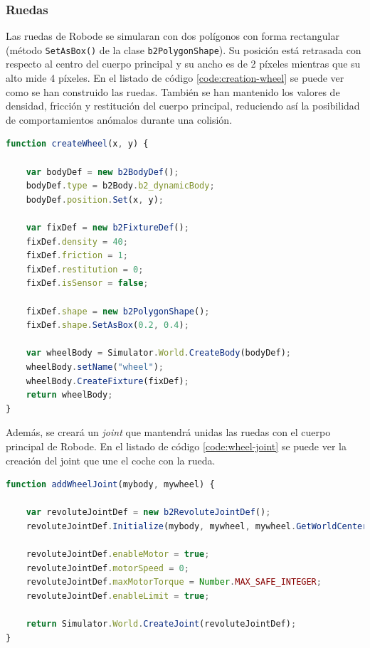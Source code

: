 \subsubsection*{Ruedas}

Las ruedas de Robode se simularan con dos polígonos con forma rectangular (método \texttt{SetAsBox()} de la clase \texttt{b2PolygonShape}). Su posición está retrasada con respecto al centro del cuerpo principal y su ancho es de 2 píxeles mientras que su alto mide 4 píxeles. En el listado de código \ref{code:creation-wheel} se puede ver como se han construido las ruedas. También se han mantenido los valores de densidad, fricción y restitución del cuerpo principal, reduciendo así la posibilidad de comportamientos anómalos durante una colisión.

\begin{lstlisting}[language={Javascript},label={code:creation-wheel}, caption={Función que crea las ruedas de Robode.}]
function createWheel(x, y) {

	var bodyDef = new b2BodyDef();
	bodyDef.type = b2Body.b2_dynamicBody;
	bodyDef.position.Set(x, y);
	
	var fixDef = new b2FixtureDef();
	fixDef.density = 40;
	fixDef.friction = 1;
	fixDef.restitution = 0;
	fixDef.isSensor = false;

	fixDef.shape = new b2PolygonShape();
	fixDef.shape.SetAsBox(0.2, 0.4);
	
	var wheelBody = Simulator.World.CreateBody(bodyDef);
	wheelBody.setName("wheel");
	wheelBody.CreateFixture(fixDef);
	return wheelBody;
}
\end{lstlisting}

Además, se creará un \emph{joint} que mantendrá unidas las ruedas con el cuerpo principal de Robode. En el listado de código  \ref{code:wheel-joint} se puede ver la creación del joint que une el coche con la rueda.

\begin{lstlisting}[language={Javascript},label={code:wheel-joint}, caption={Función que crea el joint que une la rueda al coche.}]
function addWheelJoint(mybody, mywheel) {

	var revoluteJointDef = new b2RevoluteJointDef();
	revoluteJointDef.Initialize(mybody, mywheel, mywheel.GetWorldCenter());

	revoluteJointDef.enableMotor = true;
	revoluteJointDef.motorSpeed = 0;
	revoluteJointDef.maxMotorTorque = Number.MAX_SAFE_INTEGER;
	revoluteJointDef.enableLimit = true;

	return Simulator.World.CreateJoint(revoluteJointDef);
}
\end{lstlisting}

